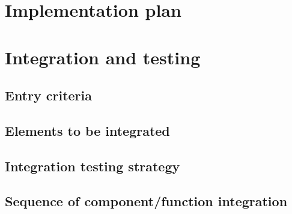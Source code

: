     \section{Implementation plan}
    \section{Integration and testing}
        \subsection{Entry criteria}
        \subsection{Elements to be integrated}
        \subsection{Integration testing strategy}
        \subsection{Sequence of component/function integration}